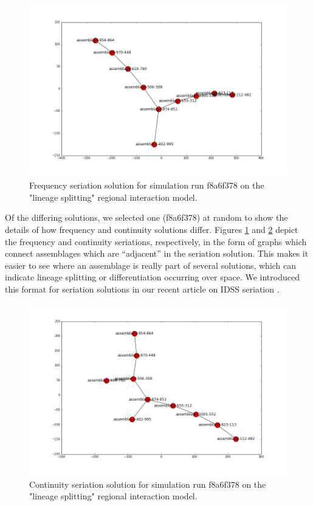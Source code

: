 \documentclass[graybox,natbib]{svmult}
\begin{document}
\begin{figure}[ht]
\centering
\includegraphics[scale=0.4]{f8a6f378-freq.png}
\caption{Frequency seriation solution for simulation run f8a6f378 on the "lineage splitting" regional interaction model.}
\label{img:differing-freq}
\end{figure}

Of the differing solutions, we selected one (f8a6f378) at random to show
the details of how frequency and continuity solutions differ. Figures
\ref{img:differing-freq} and \ref{img:differing-cont} depict the
frequency and continuity seriations, respectively, in the form of graphs
which connect assemblages which are ``adjacent'' in the seriation
solution. This makes it easier to see where an assemblage is really part
of several solutions, which can indicate lineage splitting or
differentiation occurring over space. We introduced this format for
seriation solutions in our recent article on IDSS seriation
\citep{lipomadsendunnell2015}.

\begin{figure}[ht]
\centering
\includegraphics[scale=0.4]{f8a6f378-cont.png}
\caption{Continuity seriation solution for simulation run f8a6f378 on the "lineage splitting" regional interaction model.}
\label{img:differing-cont}
\end{figure}
\end{document}
